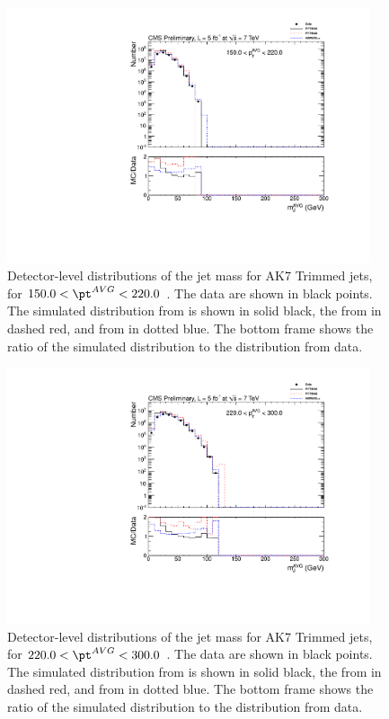 \ifnpas


\begin{figure}[htbp]
\centering
\includegraphics[width=0.95\textwidth]{figs/histAK7MjetVsPtAvg_rawDataMCComparisons_pt_3_Trimmed}
\caption{Detector-level distributions of the jet mass for AK7 Trimmed jets,
for $150.0 < \pt^{AVG} < 220.0$ \GeVc. The data are shown in black points.
The simulated distribution from \PYTHIA is shown in solid black, 
the from \PYTHIAEIGHT in dashed red, and from \HERWIG in dotted blue. 
The bottom frame shows the ratio of the simulated distribution
to the distribution from data. 
\label{figs:histAK7MjetVsPtAvg_rawDataMCComparisons_pt_3_Trimmed}}
\end{figure}



\begin{figure}[htbp]
\centering
\includegraphics[width=0.95\textwidth]{figs/histAK7MjetVsPtAvg_rawDataMCComparisons_pt_4_Trimmed}
\caption{Detector-level distributions of the jet mass for AK7 Trimmed jets,
for $220.0 < \pt^{AVG} < 300.0$ \GeVc. The data are shown in black points.
The simulated distribution from \PYTHIA is shown in solid black, 
the from \PYTHIAEIGHT in dashed red, and from \HERWIG in dotted blue. 
The bottom frame shows the ratio of the simulated distribution
to the distribution from data. 
\label{figs:histAK7MjetVsPtAvg_rawDataMCComparisons_pt_4_Trimmed}}
\end{figure}



